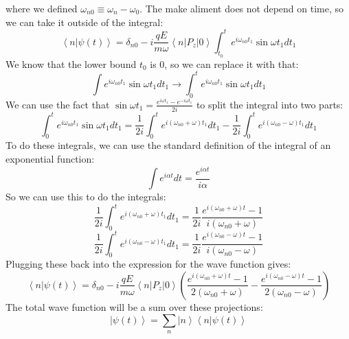 \documentclass[12pt]{article}
\begin{document}
where we defined $\omega _{n0} \equiv \omega _n - \omega _0$. The make aliment does not depend on time, so we can take it outside of the integral:
\begin{equation}
\left\langle n|\psi(t)\right\rangle = \delta _{n0} -i \frac{q E}{m \omega} \left\langle n\left|P_{z}\right|0\right\rangle \int_{t_0}^t e^{i \omega _{n0} t_1} \sin \omega t_1 d t_1
\end{equation}
We know that the lower bound $t_0$ is 0, so we can replace it with that:
\begin{equation}
\int e^{i \omega _{n0} t_1} \sin \omega t_1 d t_1 \rightarrow \int_0^t e^{i \omega _{n0} t_1} \sin \omega t_1 d t_1
\end{equation}
We can use the fact that $\sin \omega t_1 = \frac{e^{i \omega t_1} - e^{-i \omega t_1}}{2i}$ to split the integral into two parts:
\begin{equation}
\int_0^t e^{i \omega _{n0} t_1} \sin \omega t_1 d t_1 = \frac{1}{2i} \int_0^t e^{i (\omega _{n0} + \omega) t_1} d t_1 - \frac{1}{2i} \int_0^t e^{i (\omega _{n0} - \omega) t_1} d t_1
\end{equation}
To do these integrals, we can use the standard definition of the integral of an exponential function:
\begin{equation}
\int e^{i \alpha t} d t = \frac{e^{i \alpha t}}{i \alpha}
\end{equation}
So we can use this to do the integrals:
\begin{equation}
\frac{1}{2i} \int_0^t e^{i (\omega _{n0} + \omega) t_1} d t_1 = \frac{1}{2i} \frac{e^{i (\omega _{n0} + \omega) t} - 1}{i (\omega _{n0} + \omega)}
\end{equation}
\begin{equation}
\frac{1}{2i} \int_0^t e^{i (\omega _{n0} - \omega) t_1} d t_1 = \frac{1}{2i} \frac{e^{i (\omega _{n0} - \omega) t} - 1}{i (\omega _{n0} - \omega)}
\end{equation}
Plugging these back into the expression for the wave function gives:
\begin{equation}
\left\langle n|\psi(t)\right\rangle = \delta _{n0} -i \frac{q E}{m \omega} \left\langle n\left|P_{z}\right|0\right\rangle \left( \frac{e^{i (\omega _{n0} + \omega) t} - 1}{2 (\omega _{n0} + \omega)} - \frac{e^{i (\omega _{n0} - \omega) t} - 1}{2 (\omega _{n0} - \omega)} \right)
\end{equation}
The total wave function will be a sum over these projections:
\begin{equation}
\left|\psi(t)\right\rangle = \sum _{n} \left|n\right\rangle \left\langle n|\psi(t)\right\rangle
\end{equation}
\end{document}
